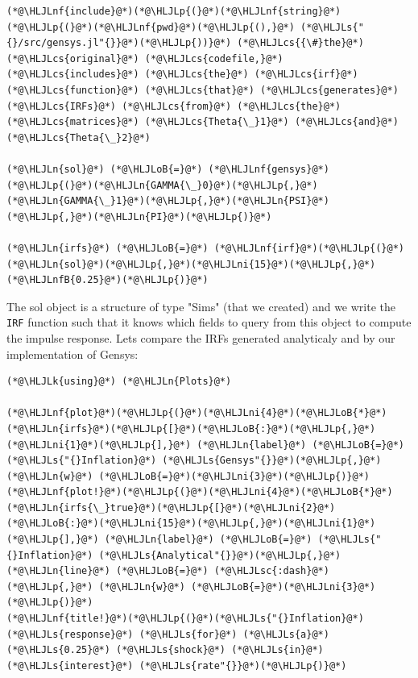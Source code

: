 \documentclass[12pt,a4paper]{article}
\newcommand{\HLJLk}[1]{\textcolor[RGB]{148,91,176}{\textbf{#1}}}
\newcommand{\HLJLn}[1]{#1}
\newcommand{\HLJLnf}[1]{\textcolor[RGB]{66,102,213}{#1}}
\newcommand{\HLJLs}[1]{\textcolor[RGB]{201,61,57}{#1}}
\newcommand{\HLJLsc}[1]{\textcolor[RGB]{201,61,57}{#1}}
\newcommand{\HLJLnfB}[1]{\textcolor[RGB]{59,151,46}{#1}}
\newcommand{\HLJLni}[1]{\textcolor[RGB]{59,151,46}{#1}}
\newcommand{\HLJLoB}[1]{\textcolor[RGB]{102,102,102}{\textbf{#1}}}
\newcommand{\HLJLp}[1]{#1}
\newcommand{\HLJLcs}[1]{\textcolor[RGB]{153,153,119}{\textit{#1}}}
\begin{document}
\begin{lstlisting}
(*@\HLJLnf{include}@*)(*@\HLJLp{(}@*)(*@\HLJLnf{string}@*)(*@\HLJLp{(}@*)(*@\HLJLnf{pwd}@*)(*@\HLJLp{(),}@*) (*@\HLJLs{"{}/src/gensys.jl"{}}@*)(*@\HLJLp{))}@*) (*@\HLJLcs{{\#}the}@*) (*@\HLJLcs{original}@*) (*@\HLJLcs{codefile,}@*) (*@\HLJLcs{includes}@*) (*@\HLJLcs{the}@*) (*@\HLJLcs{irf}@*) (*@\HLJLcs{function}@*) (*@\HLJLcs{that}@*) (*@\HLJLcs{generates}@*) (*@\HLJLcs{IRFs}@*) (*@\HLJLcs{from}@*) (*@\HLJLcs{the}@*) (*@\HLJLcs{matrices}@*) (*@\HLJLcs{Theta{\_}1}@*) (*@\HLJLcs{and}@*) (*@\HLJLcs{Theta{\_}2}@*)

(*@\HLJLn{sol}@*) (*@\HLJLoB{=}@*) (*@\HLJLnf{gensys}@*)(*@\HLJLp{(}@*)(*@\HLJLn{GAMMA{\_}0}@*)(*@\HLJLp{,}@*)(*@\HLJLn{GAMMA{\_}1}@*)(*@\HLJLp{,}@*)(*@\HLJLn{PSI}@*)(*@\HLJLp{,}@*)(*@\HLJLn{PI}@*)(*@\HLJLp{)}@*)

(*@\HLJLn{irfs}@*) (*@\HLJLoB{=}@*) (*@\HLJLnf{irf}@*)(*@\HLJLp{(}@*)(*@\HLJLn{sol}@*)(*@\HLJLp{,}@*)(*@\HLJLni{15}@*)(*@\HLJLp{,}@*)(*@\HLJLnfB{0.25}@*)(*@\HLJLp{)}@*)
\end{lstlisting}


The sol object is a structure of type "Sims" (that we created) and we write the \texttt{IRF} function such that it knows which fields to query from this object to compute the impulse response. Lets compare the IRFs generated analyticaly and by our implementation of Gensys:


\begin{lstlisting}
(*@\HLJLk{using}@*) (*@\HLJLn{Plots}@*)

(*@\HLJLnf{plot}@*)(*@\HLJLp{(}@*)(*@\HLJLni{4}@*)(*@\HLJLoB{*}@*)(*@\HLJLn{irfs}@*)(*@\HLJLp{[}@*)(*@\HLJLoB{:}@*)(*@\HLJLp{,}@*)(*@\HLJLni{1}@*)(*@\HLJLp{],}@*) (*@\HLJLn{label}@*) (*@\HLJLoB{=}@*) (*@\HLJLs{"{}Inflation}@*) (*@\HLJLs{Gensys"{}}@*)(*@\HLJLp{,}@*) (*@\HLJLn{w}@*) (*@\HLJLoB{=}@*)(*@\HLJLni{3}@*)(*@\HLJLp{)}@*)
(*@\HLJLnf{plot!}@*)(*@\HLJLp{(}@*)(*@\HLJLni{4}@*)(*@\HLJLoB{*}@*)(*@\HLJLn{irfs{\_}true}@*)(*@\HLJLp{[}@*)(*@\HLJLni{2}@*)(*@\HLJLoB{:}@*)(*@\HLJLni{15}@*)(*@\HLJLp{,}@*)(*@\HLJLni{1}@*)(*@\HLJLp{],}@*) (*@\HLJLn{label}@*) (*@\HLJLoB{=}@*) (*@\HLJLs{"{}Inflation}@*) (*@\HLJLs{Analytical"{}}@*)(*@\HLJLp{,}@*) (*@\HLJLn{line}@*) (*@\HLJLoB{=}@*) (*@\HLJLsc{:dash}@*)(*@\HLJLp{,}@*) (*@\HLJLn{w}@*) (*@\HLJLoB{=}@*)(*@\HLJLni{3}@*)(*@\HLJLp{)}@*)
(*@\HLJLnf{title!}@*)(*@\HLJLp{(}@*)(*@\HLJLs{"{}Inflation}@*) (*@\HLJLs{response}@*) (*@\HLJLs{for}@*) (*@\HLJLs{a}@*) (*@\HLJLs{0.25}@*) (*@\HLJLs{shock}@*) (*@\HLJLs{in}@*) (*@\HLJLs{interest}@*) (*@\HLJLs{rate"{}}@*)(*@\HLJLp{)}@*)
\end{lstlisting}
\end{document}
